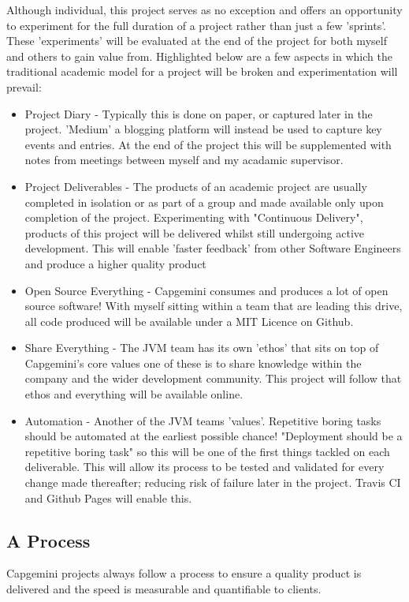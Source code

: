 Although individual, this project serves as no exception and offers an
opportunity to experiment for the full duration of a project rather than just a
few 'sprints'. These 'experiments' will be evaluated at the end of
the project for both myself and others to gain value from. Highlighted below
are a few aspects in which the traditional academic model for a project will
be broken and experimentation will prevail:
 \begin{itemize}
  \item Project Diary - Typically this is done on paper, or captured later in
   the project. 'Medium' a blogging platform will instead be used to
   capture key events and entries. At the end of the project this will be
   supplemented with notes from meetings between myself and my acadamic
   supervisor.
  \item Project Deliverables - The products of an academic project are usually
  completed in isolation or as part of a group and made available only upon
  completion of the project. Experimenting with "Continuous Delivery",
  products of this project will be delivered whilst still undergoing active
  development. This will enable 'faster feedback' from other Software
  Engineers and produce a higher quality product
  \item Open Source Everything - Capgemini consumes and
  produces a lot of open source software! With myself sitting within a team
  that are leading this drive, all code produced will be available under a MIT
  Licence on Github.
  \item Share Everything - The JVM team has its own 'ethos' that sits on top
  of Capgemini's core values one of these is to share knowledge within the
  company and the wider development community. This project will follow that
  ethos and everything will be available online.
  \item Automation - Another of the JVM teams 'values'. Repetitive boring tasks
  should be automated at the earliest possible chance! "Deployment should be a
   repetitive boring task" so this will be one of the first things tackled on
   each deliverable. This will allow its process to be tested and validated
   for every change made thereafter; reducing risk of failure later in the
   project. Travis CI and Github Pages will enable this.
 \end{itemize}

\subsection{A Process}
Capgemini projects always follow a process to ensure a quality
product is delivered and the speed is measurable and quantifiable to clients.

